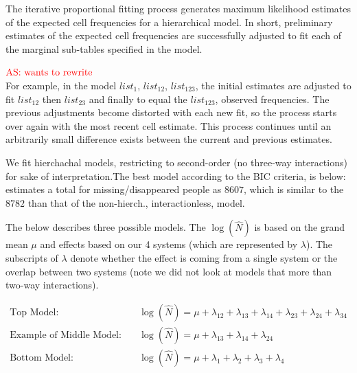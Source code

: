 \documentclass[]{article}
\begin{document}
The iterative proportional fitting process generates maximum likelihood
estimates of the expected cell frequencies for a hierarchical model. In
short, preliminary estimates of the expected cell frequencies are
successfully adjusted to fit each of the marginal sub-tables specified
in the model.

\(\textcolor{red}{\text{AS: wants to rewrite}}\)\\
For example, in the model \(list_1\), \(list_{12}\), \(list_{123}\), the
initial estimates are adjusted to fit \(list_{12}\) then \(list_{23}\)
and finally to equal the \(list_{123}\), observed frequencies. The
previous adjustments become distorted with each new fit, so the process
starts over again with the most recent cell estimate. This process
continues until an arbitrarily small difference exists between the
current and previous estimates.

We fit hierchachal models, restricting to second-order (no three-way
interactions) for sake of interpretation.The best model according to the
BIC criteria, is below: estimates a total for missing/disappeared people
as \(8607\), which is similar to the \(8782\) than that of the
non-hierch., interactionless, model.

The below describes three possible models. The \(\log(\hat{N})\) is
based on the grand mean \(\mu\) and effects based on our 4 systems
(which are represented by \(\lambda\)). The subscripts of \(\lambda\)
denote whether the effect is coming from a single system or the overlap
between two systems (note we did not look at models that more than
two-way interactions).

\[
\begin{aligned}
\text{Top Model:}\quad & \log(\hat{N}) = \mu + \lambda_{12} + \lambda_{13} + \lambda_{14} + \lambda_{23} + \lambda_{24} + \lambda_{34}
\\
\text{Example of Middle Model:}\quad & \log(\hat{N}) = \mu +  \lambda_{13} + \lambda_{14} + \lambda_{24}
\\
\text{Bottom Model:}\quad & \log(\hat{N}) = \mu + \lambda_1 + \lambda_2 + \lambda_3 + \lambda_4 
\end{aligned} 
\]
\end{document}
